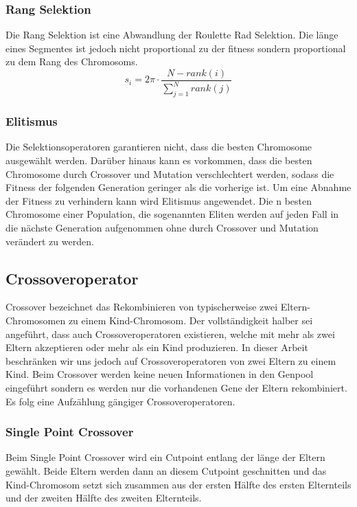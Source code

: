 \subsubsection*{Rang Selektion}
Die Rang Selektion ist eine Abwandlung der Roulette Rad Selektion. Die länge eines Segmentes ist jedoch nicht proportional zu der fitness sondern proportional zu dem Rang des Chromosoms.
\begin{equation}
    s_i = 2 \pi \cdot \frac{N - rank(i)}{\sum_{j=1}^{N} rank(j)}
\end{equation}

\subsubsection*{Elitismus}
Die Selektionsoperatoren garantieren nicht, dass die besten Chromosome ausgewählt werden. Darüber hinaus kann es vorkommen, dass die besten Chromosome durch Crossover und Mutation verschlechtert werden, sodass die Fitness der folgenden Generation geringer als die vorherige ist. Um eine Abnahme der Fitness zu verhindern kann wird Elitismus angewendet. Die n besten Chromosome einer Population, die sogenannten Eliten werden  auf jeden Fall in die nächste Generation aufgenommen ohne durch Crossover und Mutation verändert zu werden.

\subsection{Crossoveroperator}
Crossover bezeichnet das Rekombinieren von typischerweise zwei Eltern-Chromosomen zu einem Kind-Chromosom. Der vollständigkeit halber sei angeführt, dass auch Crossoveroperatoren existieren, welche  mit mehr als zwei Eltern akzeptieren oder mehr als ein Kind produzieren. In dieser Arbeit beschränken  wir uns jedoch auf Crossoveroperatoren von zwei Eltern zu einem Kind. Beim Crossover werden keine neuen Informationen in den Genpool eingeführt sondern  es werden nur die vorhandenen Gene der Eltern rekombiniert. Es folg eine Aufzählung gängiger Crossoveroperatoren.

\subsubsection*{Single Point Crossover}
Beim Single Point Crossover wird ein Cutpoint entlang der länge der Eltern gewählt. Beide Eltern werden dann an diesem Cutpoint geschnitten und das Kind-Chromosom setzt sich zusammen aus der ersten Hälfte des ersten Elternteils und der zweiten Hälfte des zweiten Elternteils.

